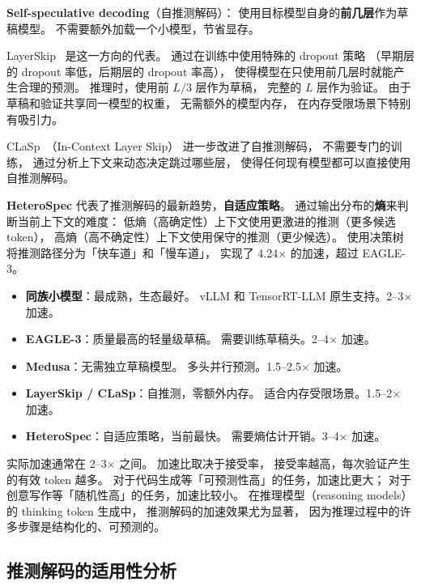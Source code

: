 \textbf{Self-speculative decoding}（自推测解码）：
使用目标模型自身的\textbf{前几层}作为草稿模型。
不需要额外加载一个小模型，节省显存。

LayerSkip~\cite{elhoushi2024layerskip} 是这一方向的代表。
通过在训练中使用特殊的 dropout 策略
（早期层的 dropout 率低，后期层的 dropout 率高），
使得模型在只使用前几层时就能产生合理的预测。
推理时，使用前 $L/3$ 层作为草稿，
完整的 $L$ 层作为验证。
由于草稿和验证共享同一模型的权重，
无需额外的模型内存，
在内存受限场景下特别有吸引力。

CLaSp~\cite{chen2025clasp}（In-Context Layer Skip）
进一步改进了自推测解码，
不需要专门的训练，
通过分析上下文来动态决定跳过哪些层，
使得任何现有模型都可以直接使用自推测解码。

\textbf{HeteroSpec} 代表了推测解码的最新趋势，\textbf{自适应策略}。
通过输出分布的\textbf{熵}来判断当前上下文的难度：
低熵（高确定性）上下文使用更激进的推测（更多候选 token），
高熵（高不确定性）上下文使用保守的推测（更少候选）。
使用决策树将推测路径分为「快车道」和「慢车道」，
实现了 4.24$\times$ 的加速，超过 EAGLE-3。

\begin{keybox}[推测解码方法速查（2026 年初）]
\begin{itemize}[noitemsep]
  \item \textbf{同族小模型}：最成熟，生态最好。
        vLLM 和 TensorRT-LLM 原生支持。2--3$\times$ 加速。
  \item \textbf{EAGLE-3}：质量最高的轻量级草稿。
        需要训练草稿头。2--4$\times$ 加速。
  \item \textbf{Medusa}：无需独立草稿模型。
        多头并行预测。1.5--2.5$\times$ 加速。
  \item \textbf{LayerSkip / CLaSp}：自推测，零额外内存。
        适合内存受限场景。1.5--2$\times$ 加速。
  \item \textbf{HeteroSpec}：自适应策略，当前最快。
        需要熵估计开销。3--4$\times$ 加速。
\end{itemize}
\end{keybox}

实际加速通常在 2--3$\times$ 之间。
加速比取决于接受率，
接受率越高，每次验证产生的有效 token 越多。
对于代码生成等「可预测性高」的任务，加速比更大；
对于创意写作等「随机性高」的任务，加速比较小。
在推理模型（reasoning models）的 thinking token 生成中，
推测解码的加速效果尤为显著，
因为推理过程中的许多步骤是结构化的、可预测的。

\subsection{推测解码的适用性分析}

